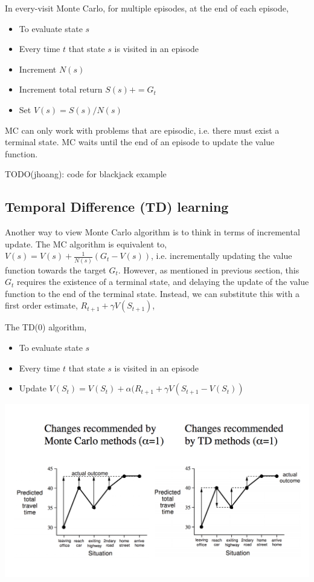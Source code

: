 \documentclass[graybox]{svmult}
\begin{document}
In every-visit Monte Carlo, for multiple episodes, at the end of each episode,
\begin{itemize}
\item To evaluate state $s$
\item Every time $t$ that state $s$ is visited in an episode
\item Increment $N(s)$
\item Increment total return $S(s) += G_t$
\item Set $V(s) = S(s) / N(s)$
\end{itemize}

MC can only work with problems that are episodic, i.e. there must exist a terminal state. MC waits until the end of an episode to update the value function.

TODO(jhoang): code for blackjack example

\subsection{Temporal Difference (TD) learning}

Another way to view Monte Carlo algorithm is to think in terms of incremental update. The MC algorithm is equivalent to, $V(s) = V(s) + \frac{1}{N(s)} (G_t - V(s))$, i.e. incrementally updating the value function towards the target $G_t$. However, as mentioned in previous section, this $G_t$ requires the existence of a terminal state, and delaying the update of the value function to the end of the terminal state. Instead, we can substitute this with a first order estimate, $R_{t+1} + \gamma V(S_{t+1})$,

The TD(0) algorithm,
\begin{itemize}
\item To evaluate state $s$
\item Every time $t$ that state $s$ is visited in an episode
\item Update $V(S_t) = V(S_t) + \alpha (R_{t+1} + \gamma V(S_{t+1} - V(S_t))$ 
\end{itemize}

\includegraphics[width=\textwidth]{mctd.png}
\end{document}
